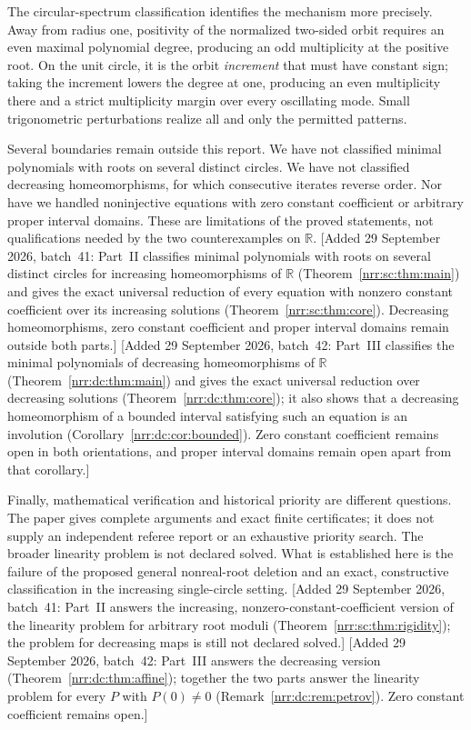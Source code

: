 \documentclass[11pt,letterpaper]{article}
\theoremstyle{definition}
\theoremstyle{remark}
\newcommand{\R}{\mathbb R}
\begin{document}
The circular-spectrum classification identifies the mechanism more
precisely. Away from radius one, positivity of the normalized two-sided
orbit requires an even maximal polynomial degree, producing an odd
multiplicity at the positive root. On the unit circle, it is the orbit
\emph{increment} that must have constant sign; taking the increment
lowers the degree at one, producing an even multiplicity there and a
strict multiplicity margin over every oscillating mode. Small
trigonometric perturbations realize all and only the permitted patterns.

Several boundaries remain outside this report. We have not classified
minimal polynomials with roots on several distinct circles. We have not
classified decreasing homeomorphisms, for which consecutive iterates
reverse order. Nor have we handled noninjective equations with zero
constant coefficient or arbitrary proper interval domains. These are
limitations of the proved statements, not qualifications needed by the
two counterexamples on $\R$.
[Added 29 September 2026, batch~41: Part~II classifies minimal polynomials
with roots on several distinct circles for increasing homeomorphisms of $\R$
(Theorem~\ref{nrr:sc:thm:main}) and gives the exact universal reduction of
every equation with nonzero constant coefficient over its increasing
solutions (Theorem~\ref{nrr:sc:thm:core}). Decreasing
homeomorphisms, zero constant coefficient and proper interval domains remain
outside both parts.]
[Added 29 September 2026, batch~42: Part~III classifies the minimal
polynomials of decreasing homeomorphisms of $\R$ (Theorem~\ref{nrr:dc:thm:main})
and gives the exact universal reduction over decreasing solutions
(Theorem~\ref{nrr:dc:thm:core}); it also shows that a decreasing homeomorphism
of a bounded interval satisfying such an equation is an involution
(Corollary~\ref{nrr:dc:cor:bounded}). Zero constant coefficient remains open
in both orientations, and proper interval domains remain open apart from that
corollary.]

Finally, mathematical verification and historical priority are different
questions. The paper gives complete arguments and exact finite
certificates; it does not supply an independent referee report or an
exhaustive priority search. The broader linearity problem is not declared
solved. What is established here is the failure of the proposed general
nonreal-root deletion and an exact, constructive classification in the
increasing single-circle setting.
[Added 29 September 2026, batch~41: Part~II answers the increasing,
nonzero-constant-coefficient version of the linearity problem for arbitrary
root moduli (Theorem~\ref{nrr:sc:thm:rigidity}); the problem for decreasing
maps is still not declared solved.]
[Added 29 September 2026, batch~42: Part~III answers the decreasing version
(Theorem~\ref{nrr:dc:thm:affine}); together the two parts answer the
linearity problem for every $P$ with $P(0)\ne0$
(Remark~\ref{nrr:dc:rem:petrov}). Zero constant coefficient remains open.]
\end{document}
